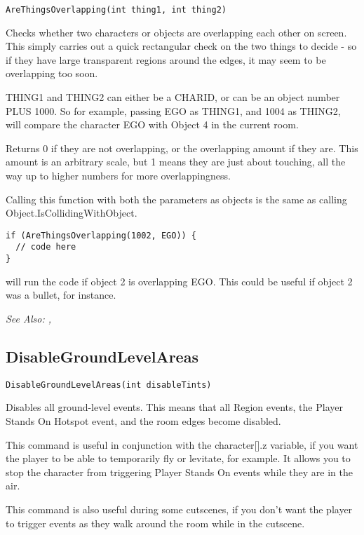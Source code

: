 \begin{verbatim}
AreThingsOverlapping(int thing1, int thing2)
\end{verbatim}
Checks whether two characters or objects are overlapping each other on screen. This simply
carries out a quick rectangular check on the two things to decide - so if they have large
transparent regions around the edges, it may seem to be overlapping too soon.

THING1 and THING2 can either be a CHARID, or can be an object number PLUS 1000.
So for example, passing EGO as THING1, and 1004 as THING2, will compare the character EGO
with Object 4 in the current room.

Returns 0 if they are not overlapping, or the overlapping amount if they are. This amount
is an arbitrary scale, but 1 means they are just about touching, all the way up to higher numbers
for more overlappingness.

Calling this function with both the parameters as objects is the same as calling Object.IsCollidingWithObject.

\begin{verbatim}
if (AreThingsOverlapping(1002, EGO)) {
  // code here
}
\end{verbatim}
will run the code if object 2 is overlapping EGO. This could be useful if object 2 was a bullet,
for instance.

\it{See Also:} ,



\subsection{DisableGroundLevelAreas}\label{DisableGroundLevelAreas}%

\begin{verbatim}
DisableGroundLevelAreas(int disableTints)
\end{verbatim}
Disables all ground-level events. This means that all Region events, the Player Stands
On Hotspot event, and the room edges become disabled.

This command is useful in conjunction with the character[].z variable, if you want the player
to be able to temporarily fly or levitate, for example. It allows you to stop the character
from triggering Player Stands On events while they are in the air.

This command is also useful during some cutscenes, if you don't want the player to trigger
events as they walk around the room while in the cutscene.

